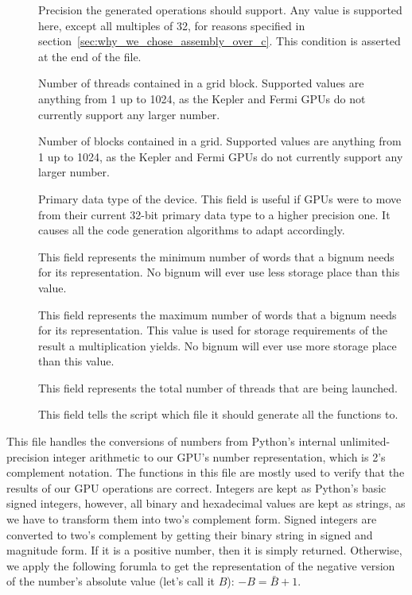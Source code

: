 \documentclass[12pt, a4paper]{report}
\begin{document}
\begin{description}
\begin{description}
\item[] Precision the generated operations should support.
Any value is supported here, except all multiples of 32, for reasons specified
in section~\ref{sec:why_we_chose_assembly_over_c}.
This condition is asserted at the end of the file.
\item[] Number of threads contained in a grid block.
Supported values are anything from 1 up to 1024, as the Kepler and Fermi GPUs do not currently
support any larger number.
\item[] Number of blocks contained in a grid.
Supported values are anything from 1 up to 1024, as the Kepler and Fermi GPUs do not currently
support any larger number.
\item[] Primary data type of the device.
This field is useful if GPUs were to move from their current  32-bit primary
data type to a higher precision one.
It causes all the code generation algorithms to adapt accordingly.
\item[] This field represents the minimum number
of words that a bignum needs for its representation.
No bignum will ever use less storage place than this value.
\item[] This field represents the maximum number
of words that a bignum needs for its representation.
This value is used for storage requirements of the result a multiplication
yields.
No bignum will ever use more storage place than this value.
\item[] This field represents the total number of threads
that are being launched.
\item[] This field tells the script which file it
should generate all the functions to.
\end{description}

\item[\Q{conversions.py}]
This file handles the conversions of numbers from Python's internal
unlimited-precision integer arithmetic to our GPU's number representation, which
is 2's complement notation.
The functions in this file are mostly used to verify that the results of our GPU
operations are correct.
Integers are kept as Python's basic signed integers, however, all binary and
hexadecimal values are kept as strings, as we have to transform them into two's
complement form.
Signed integers are converted to two's complement by getting their binary string
in signed and magnitude form.
If it is a positive number, then it is simply returned.
Otherwise, we apply the following forumla to get the representation of the
negative version of the number's absolute value (let's call it $B$):
$-B = \bar{B} + 1$.


\end{description}
\end{document}

